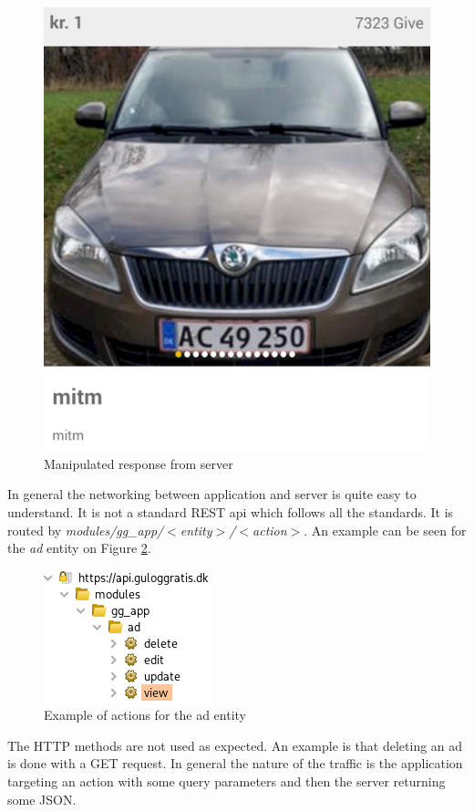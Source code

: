 \begin{figure}[htbp]
    \centering
    \includegraphics[width=0.5\columnwidth]{../dynamic-analysis/pictures/server-client-mitm.png}
    \caption{Manipulated response from server}
    \label{fig:server-client-mitm}
\end{figure}

In general the networking between application and server is quite easy to understand. It is not a standard REST api which follows all the standards. It is routed by \textit{modules/gg\_app/$<$entity$>$/$<$action$>$}. An example can be seen for the \textit{ad} entity on Figure \ref{fig:ad-actions}. 

\begin{figure}[htbp]
    \centering
    \includegraphics[width=0.5\columnwidth]{../dynamic-analysis/pictures/ad-actions.png}
    \caption{Example of actions for the ad entity}
    \label{fig:ad-actions}
\end{figure}

The HTTP methods are not used as expected. An example is that deleting an ad is done with a GET request. In general the nature of the traffic is the application targeting an action with some query parameters and then the server returning some JSON.    